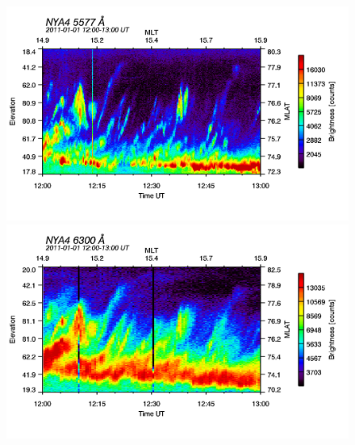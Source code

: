 \begin{figure}
\begin{minipage}{0.49\textwidth}
\includegraphics[width=1\linewidth]{Figures/Allsky/5577/nya4_20110101_1200_1300_5577_cal.png}
\end{minipage}
\begin{minipage}{0.49\textwidth}
\includegraphics[width=1\linewidth]{Figures/Allsky/6300/nya4_20110101_1200_1300_6300_cal.png}
\end{minipage}


\end{figure}
